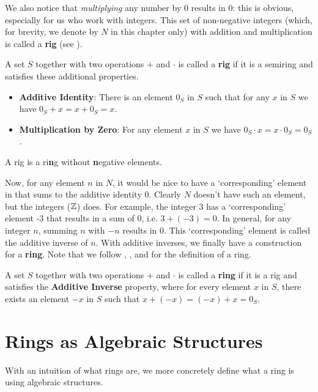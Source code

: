 We also notice that \textit{multiplying} any number by 0 results in 0: this is obvious, especially for us who work with integers. This set of non-negative integers (which, for brevity, we denote by $N$ in this chapter only) with addition and multiplication is called a \textbf{rig} (see \cite{proofwiki_rig-definition}).
\begin{definition}
    A set $S$ together with two operations $+$ and $\cdot$ is called a \textbf{rig} if it is a semiring and satisfies these additional properties.
    \begin{itemize}
        \item \textbf{Additive Identity}: There is an element $0_S$ in $S$ such that for any $x$ in $S$ we have $0_S + x = x + 0_S = x$.
        \item \textbf{Multiplication by Zero}: For any element $x$ in $S$ we have $0_S \cdot x = x \cdot 0_S = 0_S$.
    \end{itemize}
\end{definition}
\begin{remark}
    A rig is a ri\textbf{n}g without \textbf{n}egative elements.
\end{remark}

Now, for any element $n$ in $N$, it would be nice to have a `corresponding' element in that sums to the additive identity 0. Clearly $N$ doesn't have such an element, but the integers ($\mathbb{Z}$) does. For example, the integer 3 has a `corresponding' element -3 that results in a sum of 0, i.e. $3 + (-3) = 0$. In general, for any integer $n$, summing $n$ with $-n$ results in 0. This `corresponding' element is called the additive inverse of $n$. With additive inverses, we finally have a construction for a \textbf{ring}. Note that we follow \cite[p.~223]{dummit_foote_2004}, \cite[p.~115, Definition 1.1]{hungerford_1980}, and \cite{proofwiki_ring-definition} for the definition of a ring.
\begin{definition}
    A set $S$ together with two operations $+$ and $\cdot$ is called a \textbf{ring} if it is a rig and satisfies the \textbf{Additive Inverse} property, where for every element $x$ in $S$, there exists an element $-x$ in $S$ such that $x + (-x) = (-x) + x = 0_S$.
\end{definition}

\section{Rings as Algebraic Structures}
With an intuition of what rings are, we more concretely define what a ring is using algebraic structures.

